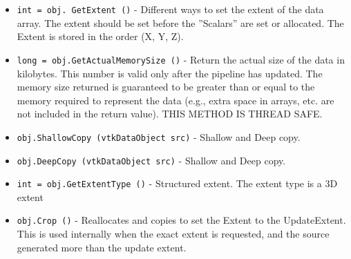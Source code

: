 \begin{itemize}
\item  \verb|int = obj. GetExtent ()| -  Different ways to set the extent of the data array.  The extent
 should be set before the ''Scalars'' are set or allocated.
 The Extent is stored  in the order (X, Y, Z).

\item  \verb|long = obj.GetActualMemorySize ()| -  Return the actual size of the data in kilobytes. This number
 is valid only after the pipeline has updated. The memory size
 returned is guaranteed to be greater than or equal to the
 memory required to represent the data (e.g., extra space in
 arrays, etc. are not included in the return value). THIS METHOD
 IS THREAD SAFE.

\item  \verb|obj.ShallowCopy (vtkDataObject src)| -  Shallow and Deep copy.

\item  \verb|obj.DeepCopy (vtkDataObject src)| -  Shallow and Deep copy.

\item  \verb|int = obj.GetExtentType ()| -  Structured extent. The extent type is a 3D extent

\item  \verb|obj.Crop ()| -  Reallocates and copies to set the Extent to the UpdateExtent.
 This is used internally when the exact extent is requested, 
 and the source generated more than the update extent. 

\end{itemize}
